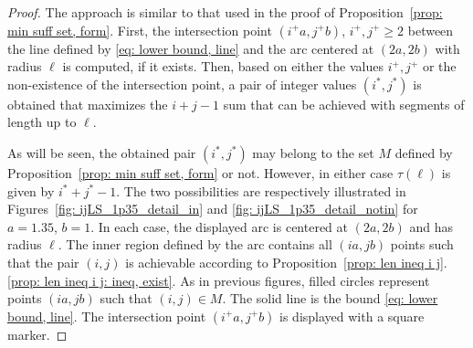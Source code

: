 \documentclass[12pt, a4paper]{article}
\newcommand{\funt}{\tau} %
\newcommand{\len}{\ell} %
\newcommand{\isolr}{i^+}
\newcommand{\jsolr}{j^+}
\newcommand{\isoli}{i^\ast}
\newcommand{\jsoli}{j^\ast}
\newcommand{\mss}{M}
\begin{document}
\begin{proof}
The approach is similar to that used in the proof of Proposition~\ref{prop: min suff set, form}. First, the intersection point $(\isolr a, \jsolr b)$, $\isolr, \jsolr \geq 2$ between the line defined by \eqref{eq: lower bound, line} and the arc centered at $(2a,2b)$ with radius $\len$ is computed, if it exists. Then, based on either the values $\isolr, \jsolr$ or the non-existence of the intersection point, a pair of integer values $(\isoli, \jsoli)$ is obtained that maximizes the $i+j-1$ sum that can be achieved with segments of length up to $\len$.

As will be seen, the obtained pair $(\isoli,\jsoli)$ may belong to the set $\mss$ defined by Proposition~\ref{prop: min suff set, form} or not. However, in either case $\funt(\len)$ is given by $\isoli+\jsoli-1$. The two possibilities are respectively illustrated in Figures~\ref{fig: ijLS_1p35_detail_in} and \ref{fig: ijLS_1p35_detail_notin} for $a=1.35$, $b=1$. In each case, the displayed arc is centered at $(2a,2b)$ and has radius $\len$. The inner region defined by the arc contains all $(ia,jb)$ points such that the pair $(i,j)$ is achievable according to Proposition~\ref{prop: len ineq i j}.\ref{prop: len ineq i j: ineq, exist}. As in previous figures, filled circles represent points $(ia,jb)$ such that $(i,j) \in \mss$. The solid line is the bound \eqref{eq: lower bound, line}. The intersection point $(\isolr a, \jsolr b)$ is displayed with a square marker.


\end{proof}
\end{document}
